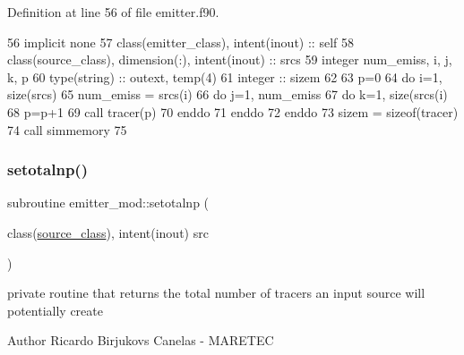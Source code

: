 Definition at line 56 of file emitter.\+f90.


\begin{DoxyCode}
56     \textcolor{keywordtype}{implicit none}
57     \textcolor{keywordtype}{class}(emitter\_class), \textcolor{keywordtype}{intent(inout)} :: self
58     \textcolor{keywordtype}{class}(source\_class), \textcolor{keywordtype}{dimension(:)}, \textcolor{keywordtype}{intent(inout)} :: srcs
59     \textcolor{keywordtype}{integer} num\_emiss, i, j, k, p
60     \textcolor{keywordtype}{type}(string) :: outext, temp(4)
61     \textcolor{keywordtype}{integer} :: sizem
62 
63     p=0
64     \textcolor{keywordflow}{do} i=1, \textcolor{keyword}{size}(srcs)
65         num\_emiss = srcs(i)%
66         \textcolor{keywordflow}{do} j=1, num\_emiss
67             \textcolor{keywordflow}{do} k=1, \textcolor{keyword}{size}(srcs(i)%
68                 p=p+1
69                 \textcolor{keyword}{call }tracer(p)%
70 \textcolor{keywordflow}{            enddo}
71 \textcolor{keywordflow}{        enddo}
72 \textcolor{keywordflow}{    enddo}
73     sizem = sizeof(tracer)
74     \textcolor{keyword}{call }simmemory%
75 
\end{DoxyCode}
\mbox{\label{namespaceemitter__mod_a5c219dd6692a761ad4bf968ae750fcc6}} 
\subsubsection{\texorpdfstring{setotalnp()}{setotalnp()}}
{\footnotesize\ttfamily subroutine emitter\+\_\+mod\+::setotalnp (\begin{DoxyParamCaption}\item[{class(\mbox{\hyperlink{structsources__mod_1_1source__class}{source\+\_\+class}}), intent(inout)}]{src }\end{DoxyParamCaption})\hspace{0.3cm}{\ttfamily [private]}}



private routine that returns the total number of tracers an input source will potentially create 

\begin{DoxyAuthor}{Author}
Ricardo Birjukovs Canelas -\/ M\+A\+R\+E\+T\+EC
\end{DoxyAuthor}


